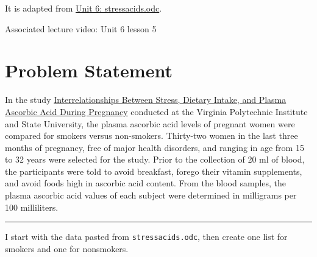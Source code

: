 \documentclass[
  letterpaper,
  DIV=11,
  numbers=noendperiod]{scrreprt}
\begin{document}
It is adapted from \href{../odc_files/unit6/stressacids.odc}{Unit 6:
stressacids.odc}.

Associated lecture video: Unit 6 lesson 5

\hypertarget{problem-statement}{%
\section*{Problem Statement}\label{problem-statement}}


In the study
\href{https://vtechworks.lib.vt.edu/handle/10919/74486}{Interrelationships
Between Stress, Dietary Intake, and Plasma Ascorbic Acid During
Pregnancy} conducted at the Virginia Polytechnic Institute and State
University, the plasma ascorbic acid levels of pregnant women were
compared for smokers versus non-smokers. Thirty-two women in the last
three months of pregnancy, free of major health disorders, and ranging
in age from 15 to 32 years were selected for the study. Prior to the
collection of 20 ml of blood, the participants were told to avoid
breakfast, forego their vitamin supplements, and avoid foods high in
ascorbic acid content. From the blood samples, the plasma ascorbic acid
values of each subject were determined in milligrams per 100
milliliters.

\begin{center}\rule{0.5\linewidth}{0.5pt}\end{center}

I start with the data pasted from \texttt{stressacids.odc}, then create
one list for smokers and one for nonsmokers.
\end{document}
